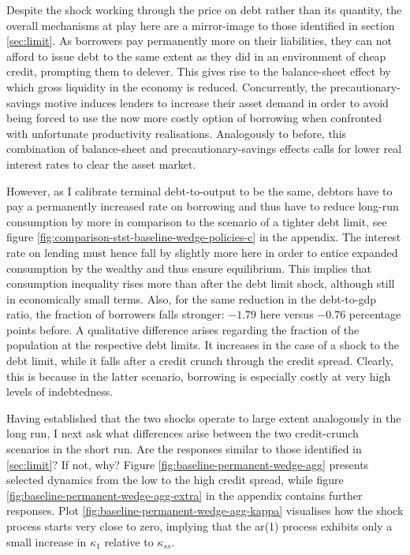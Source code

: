 \documentclass[a4paper,12pt]{article} %
\numberwithin{equation}{section} %
\numberwithin{figure}{section}
\numberwithin{table}{section}
\begin{document}
Despite the shock working through the price on debt rather than its quantity, the overall mechanisms at play here are a mirror-image to those identified in section \ref{sec:limit}. As borrowers pay permanently more on their liabilities, they can not afford to issue debt to the same extent as they did in an environment of cheap credit, prompting them to delever. This gives rise to the balance-sheet effect by which gross liquidity in the economy is reduced. Concurrently, the precautionary-savings motive induces lenders to increase their asset demand in order to avoid being forced to use the now more costly option of borrowing when confronted with unfortunate productivity realisations. Analogously to before, this combination of balance-sheet and precautionary-savings effects calls for lower real interest rates to clear the asset market. 

However, as I calibrate terminal debt-to-output to be the same, debtors have to pay a permanently increased rate on borrowing and thus have to reduce long-run consumption by more in comparison to the scenario of a tighter debt limit, see figure \ref{fig:comparison-stst-baseline-wedge-policies-c} in the appendix. The interest rate on lending must hence fall by slightly more here in order to entice expanded consumption by the wealthy and thus ensure equilibrium. This implies that consumption inequality rises more than after the debt limit shock, although still in economically small terms. Also, for the same reduction in the debt-to-\Gls{gdp} ratio, the fraction of borrowers falls stronger: $-1.79$ here versus $-0.76$ percentage points before. A qualitative difference arises regarding the fraction of the population at the respective debt limits. It increases in the case of a shock to the debt limit, while it falls after a credit crunch through the credit spread. Clearly, this is because in the latter scenario, borrowing is especially costly at very high levels of indebtedness. 

Having established that the two shocks operate to large extent analogously in the long run, I next ask what differences arise between the two credit-crunch scenarios in the short run. Are the responses similar to those identified in \ref{sec:limit}? If not, why? Figure \ref{fig:baseline-permanent-wedge-agg} presents selected dynamics from the low to the high credit spread, while figure \ref{fig:baseline-permanent-wedge-agg-extra} in the appendix contains further responses. Plot \ref{fig:baseline-permanent-wedge-agg-kappa} visualises how the shock process starts very close to zero, implying that the \Gls{ar}(1) process exhibits only a small increase in $\kappa_1$ relative to $\kappa_{ss}$. 
\end{document}

